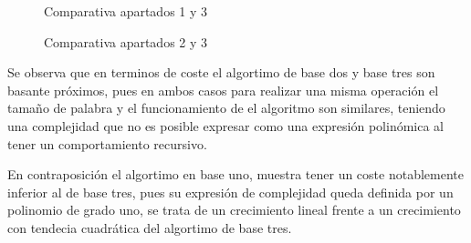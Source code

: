 \begin{figure}[h]
    \centering
    \begin{minipage}[b]{0.45\linewidth}
    \centering
    
    \caption{ Comparativa apartados 1 y 3}
    \end{minipage}
    \hspace{0.5cm}
    \begin{minipage}[b]{0.45\linewidth}
    \centering
    
    \caption{ Comparativa apartados 2 y 3}
    \end{minipage}
\end{figure}

Se observa que en terminos de coste el algortimo de base dos y base tres son basante próximos, pues en ambos casos para realizar una misma operación el tamaño de palabra y el funcionamiento de el algoritmo son similares, teniendo una complejidad que no es posible expresar como una expresión polinómica al tener un comportamiento recursivo.\medskip

En contraposición el algortimo en base uno, muestra tener un coste notablemente inferior al de base tres, pues su expresión de complejidad queda definida por un polinomio de grado uno, se trata de un crecimiento lineal frente a un crecimiento con tendecia cuadrática del algortimo de base tres.